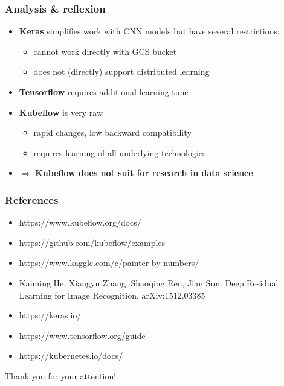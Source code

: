 \documentclass[aspectratio=169]{beamer}
\begin{document}
\begin{frame}
\frametitle{Analysis \& reflexion}

\begin{itemize}
	\item \textbf{Keras} simplifies work with CNN models but have several restrictions:
	\begin{itemize}
		\item cannot work directly with GCS bucket
		\item does not (directly) support distributed learning
	\end{itemize}
	\item \textbf{Tensorflow} requires additional learning time
	\item \textbf{Kubeflow} is very raw
	\begin{itemize}
		\item rapid changes, low backward compatibility
		\item requires learning of all underlying technologies 
	\end{itemize}
	\item $\Rightarrow$ \textbf{Kubeflow does not suit for research in data science} 
\end{itemize}

\end{frame}


\begin{frame}
\frametitle{References}

\begin{itemize}
	\item https://www.kubeflow.org/docs/
	\item https://github.com/kubeflow/examples
	\item https://www.kaggle.com/c/painter-by-numbers/
	\item Kaiming He, Xiangyu Zhang, Shaoqing Ren, Jian Sun. Deep Residual Learning for Image Recognition, arXiv:1512.03385
	\item https://keras.io/
	\item https://www.tensorflow.org/guide
	\item https://kubernetes.io/docs/
	
\end{itemize}

\end{frame}


\begin{frame}
\Huge{\centerline{Thank you for your attention!}}\end{frame}
\end{document}
